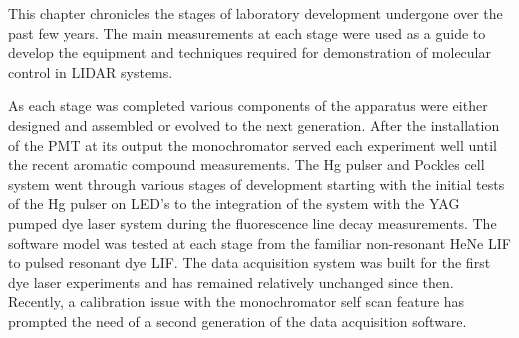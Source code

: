 This chapter chronicles the stages of laboratory development undergone over the past few years. The main measurements at each stage were used as a guide to develop the equipment and techniques required for demonstration of molecular control in LIDAR systems.

As each stage was completed various components of the apparatus were either designed and assembled or evolved to the next generation. After the installation of the PMT at its output the monochromator served each experiment well until the recent aromatic compound measurements. The Hg pulser and Pockles cell system went through various stages of development starting with the initial tests of the Hg pulser on LED's to the integration of the system with the YAG pumped dye laser system during the fluorescence line decay measurements. The software model was tested at each stage from the familiar non-resonant HeNe LIF to pulsed resonant dye LIF. The data acquisition system was built for the first dye laser experiments and has remained relatively unchanged since then. Recently, a calibration issue with the monochromator self scan feature has prompted the need of a second generation of the data acquisition software.
